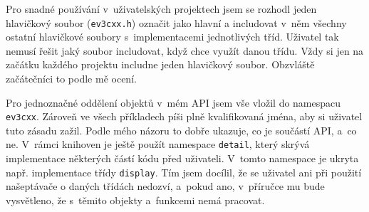 Pro snadné používání v~uživatelských projektech jsem se rozhodl jeden hlavičkový soubor (\texttt{ev3cxx.h}) označit jako hlavní a includovat v~něm všechny ostatní hlavičkové soubory s~implementacemi jednotlivých tříd.
% 
% 
%
%
%
%
% 
% 
Uživatel tak nemusí řešit jaký soubor includovat, když chce využít danou třídu.
% 
% 
%
%
%
%
%
%
Vždy si jen na začátku každého projektu includne jeden hlavičkový soubor.
% 
% 
%
%
%
%
%
%
%
%
Obzvláště začátečníci to podle mě ocení.

Pro jednoznačné oddělení objektů v~mém API jsem vše vložil do namespacu \texttt{ev3cxx}. 
Zároveň ve všech příkladech píši plně kvalifikovaná jména, aby si uživatel tuto zásadu zažil. 
Podle mého názoru to dobře ukazuje, co je součástí API, a~co ne.
V~rámci knihoven je ještě použít namespace \texttt{detail}, který skrývá implementace některých částí kódu před uživateli.
V~tomto namespace je ukryta např.  implementace třídy \texttt{display}. 
Tím jsem docílil, že se uživatel ani při použití našeptávače o daných třídách nedozví, a~pokud ano, v~příručce mu bude vysvětleno, že s~těmito objekty a~funkcemi nemá pracovat.
% 
% 



